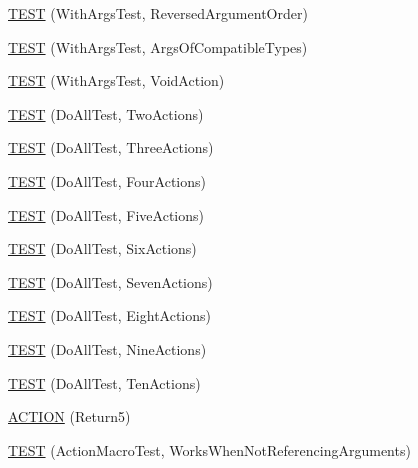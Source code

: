 \begin{DoxyCompactItemize}
\item 
\hyperlink{namespacetesting_1_1gmock__generated__actions__test_a8a9dc47b8e9810ca74166a9d17cba54f}{T\+E\+ST} (With\+Args\+Test, Reversed\+Argument\+Order)
\item 
\hyperlink{namespacetesting_1_1gmock__generated__actions__test_a4330224375c915f21860c30798dacd0c}{T\+E\+ST} (With\+Args\+Test, Args\+Of\+Compatible\+Types)
\item 
\hyperlink{namespacetesting_1_1gmock__generated__actions__test_a744fd048a745e3df48a578ed251003c6}{T\+E\+ST} (With\+Args\+Test, Void\+Action)
\item 
\hyperlink{namespacetesting_1_1gmock__generated__actions__test_ab1820fa999561582ae20885c4149a634}{T\+E\+ST} (Do\+All\+Test, Two\+Actions)
\item 
\hyperlink{namespacetesting_1_1gmock__generated__actions__test_a9fe00b82e3daa39501cefb4636b1909c}{T\+E\+ST} (Do\+All\+Test, Three\+Actions)
\item 
\hyperlink{namespacetesting_1_1gmock__generated__actions__test_aa6ed664752eab81abc0c8ec08bc28fe0}{T\+E\+ST} (Do\+All\+Test, Four\+Actions)
\item 
\hyperlink{namespacetesting_1_1gmock__generated__actions__test_adf15fb74ccf2a473a31f0ae733210f3f}{T\+E\+ST} (Do\+All\+Test, Five\+Actions)
\item 
\hyperlink{namespacetesting_1_1gmock__generated__actions__test_af9328f486c8862bfb3a08bd9c0b10a2d}{T\+E\+ST} (Do\+All\+Test, Six\+Actions)
\item 
\hyperlink{namespacetesting_1_1gmock__generated__actions__test_aa1eb8dae72fb173011bf64027f075cea}{T\+E\+ST} (Do\+All\+Test, Seven\+Actions)
\item 
\hyperlink{namespacetesting_1_1gmock__generated__actions__test_a7e7ffc936de010908f42193b951016e3}{T\+E\+ST} (Do\+All\+Test, Eight\+Actions)
\item 
\hyperlink{namespacetesting_1_1gmock__generated__actions__test_ae2037cf34f7bbdb2aa779f31f44c0530}{T\+E\+ST} (Do\+All\+Test, Nine\+Actions)
\item 
\hyperlink{namespacetesting_1_1gmock__generated__actions__test_a11cc35bfa98278915c040aac2329b4a7}{T\+E\+ST} (Do\+All\+Test, Ten\+Actions)
\item 
\hyperlink{namespacetesting_1_1gmock__generated__actions__test_a1275b0757e9f1caf70fbc23da141acd3}{A\+C\+T\+I\+ON} (Return5)
\item 
\hyperlink{namespacetesting_1_1gmock__generated__actions__test_a6a73da775945f4294d9377b0110bb237}{T\+E\+ST} (Action\+Macro\+Test, Works\+When\+Not\+Referencing\+Arguments)

\end{DoxyCompactItemize}
